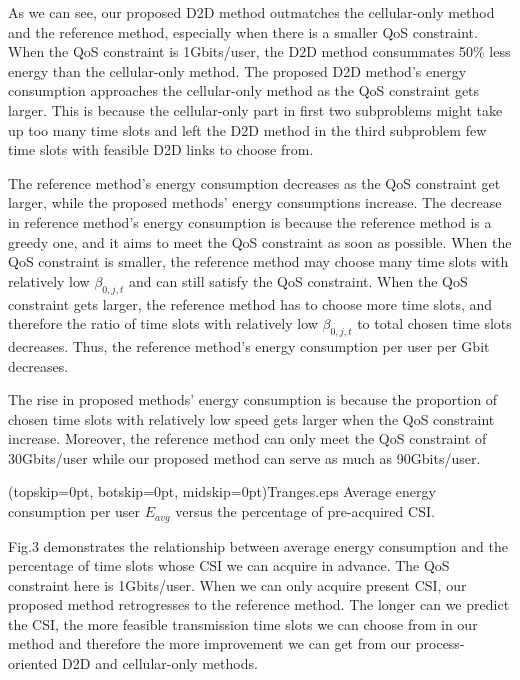 \documentclass{ieeeaccess}
\begin{document}
As we can see, our proposed D2D method outmatches the cellular-only method and the reference method, especially when there is a smaller QoS constraint. When the QoS constraint is 1Gbits/user, the D2D method consummates 50\% less energy than the cellular-only method. The proposed D2D method's energy consumption approaches the cellular-only method as the QoS constraint gets larger. This is because the cellular-only part in first two subproblems might take up too many time slots and left the D2D method in the third subproblem few time slots with feasible D2D links to choose from.

The reference method's energy consumption decreases as the QoS constraint get larger, while the proposed methods' energy consumptions increase. The decrease in reference method's energy consumption is because the reference method is a greedy one, and it aims to meet the QoS constraint as soon as possible. When the QoS constraint is smaller, the reference method may choose many time slots with relatively low ${\beta _{0,j,t}}$ and can still satisfy the QoS constraint. When the QoS constraint gets larger, the reference method has to choose more time slots, and therefore the ratio of time slots with relatively low ${\beta _{0,j,t}}$ to total chosen time slots decreases. Thus, the reference method's energy consumption per user per Gbit decreases.

The rise in proposed methods' energy consumption is because the proportion of chosen time slots with relatively low speed gets larger when the QoS constraint increase. Moreover, the reference method can only meet the QoS constraint of 30Gbits/user while our proposed method can serve as much as 90Gbits/user.


\Figure[t!](topskip=0pt, botskip=0pt, midskip=0pt){Tranges.eps}
{Average energy consumption per user $E_{avg}$ versus the percentage of pre-acquired CSI.\label{fig3}}



Fig.3 demonstrates the relationship between average energy consumption and the percentage of time slots whose CSI we can acquire in advance. The QoS constraint here is 1Gbits/user.
When we can only acquire present CSI, our proposed method retrogresses to the reference method. The longer can we predict the CSI, the more feasible transmission time slots we can choose from in our method and therefore the more improvement we can get from our process-oriented D2D and cellular-only methods.
\end{document}
